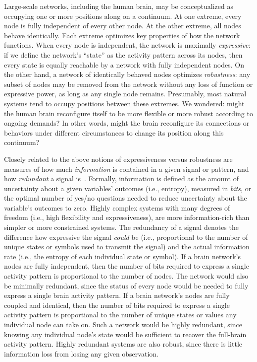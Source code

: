 \documentclass[english, 11pt]{article}
\begin{document}
Large-scale networks, including the human brain, may be conceptualized as
occupying one or more positions along on a continuum. At one extreme, every
node is fully independent of every other node. At the other extreme, all nodes
behave identically. Each extreme optimizes key properties of how the network
functions. When every node is independent, the network is maximally
\textit{expressive}: if we define the network's ``state'' as the activity
pattern across its nodes, then every state is equally reachable by a network
with fully independent nodes. On the other hand, a network of identically
behaved nodes optimizes \textit{robustness}: any subset of nodes may be removed
from the network without any loss of function or expressive power, as long as
any single node remains. Presumably, most natural systems tend to occupy
positions between these extremes. We wondered: might the human brain
reconfigure itself to be more flexible or more robust according to ongoing
demands? In other words, might the brain reconfigure its connections or
behaviors under different circumstances to change its position along this
continuum?

Closely related to the above notions of expressiveness versus robustness are
measures of how much \textit{information} is contained in a given signal or
pattern, and how \textit{redundant} a signal is~\citep{Shan48}. Formally,
information is defined as the amount of uncertainty about a given variables'
outcomes (i.e., entropy), measured in \textit{bits}, or the optimal number of
yes/no questions needed to reduce uncertainty about the variable's outcomes to
zero. Highly complex systems with many degrees of freedom (i.e., high
flexibility and expressiveness), are more information-rich than simpler or more
constrained systems. The redundancy of a signal denotes the difference how
expressive the signal \textit{could} be (i.e., proportional to the number of
unique states or symbols used to transmit the signal) and the actual
information rate (i.e., the entropy of each individual state or symbol). If a
brain network's nodes are fully independent, then the number of bits required
to express a single activity pattern is proportional to the number of nodes.
The network would also be minimally redundant, since the status of every node
would be needed to fully express a single brain activity pattern. If a brain
network's nodes are fully coupled and identical, then the number of bits
required to express a single activity pattern is proportional to the number of
unique states or values any individual node can take on. Such a network would
be highly redundant, since knowing any individual node's state would be
sufficient to recover the full-brain activity pattern. Highly redundant systems
are also robust, since there is little information loss from losing any given
observation.
\end{document}
